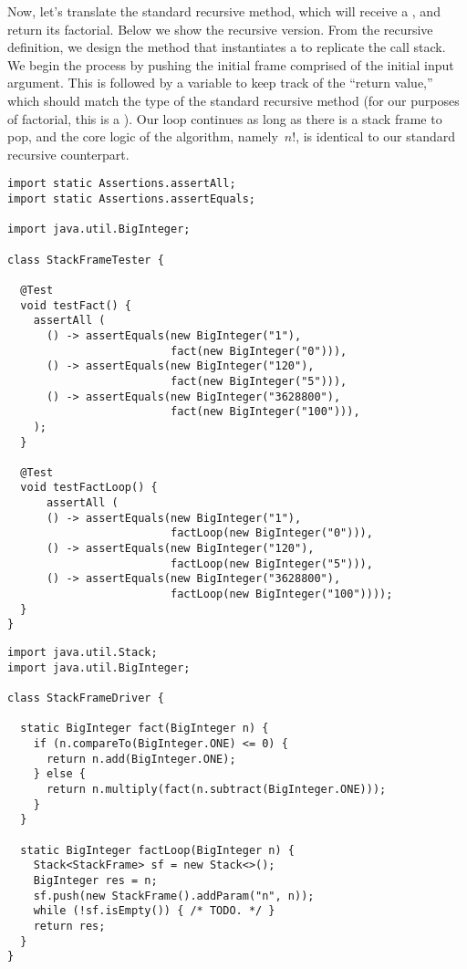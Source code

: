 Now, let's translate the standard recursive  method, which will receive a , and return its factorial. 
Below we show the recursive version. 
From the recursive definition, we design the  method that instantiates a  to replicate the call stack. 
We begin the process by pushing the initial frame comprised of the initial input argument. 
This is followed by a variable to keep track of the ``return value,'' which should match the type of the standard recursive method (for our purposes of factorial, this is a ). 
Our loop continues as long as there is a stack frame to pop, and the core logic of the algorithm, namely~$n!$, is identical to our standard recursive counterpart.

\begin{lstlisting}[language=MyJava]
import static Assertions.assertAll;
import static Assertions.assertEquals;

import java.util.BigInteger;

class StackFrameTester {

  @Test
  void testFact() {
    assertAll (
      () -> assertEquals(new BigInteger("1"), 
                         fact(new BigInteger("0"))),
      () -> assertEquals(new BigInteger("120"), 
                         fact(new BigInteger("5"))),
      () -> assertEquals(new BigInteger("3628800"), 
                         fact(new BigInteger("100"))),
    );
  }

  @Test
  void testFactLoop() {
      assertAll (
      () -> assertEquals(new BigInteger("1"), 
                         factLoop(new BigInteger("0"))),
      () -> assertEquals(new BigInteger("120"), 
                         factLoop(new BigInteger("5"))),
      () -> assertEquals(new BigInteger("3628800"), 
                         factLoop(new BigInteger("100"))));
  }
}  
\end{lstlisting}

\begin{lstlisting}[language=MyJava]
import java.util.Stack;
import java.util.BigInteger;

class StackFrameDriver {

  static BigInteger fact(BigInteger n) {
    if (n.compareTo(BigInteger.ONE) <= 0) {
      return n.add(BigInteger.ONE);
    } else {
      return n.multiply(fact(n.subtract(BigInteger.ONE)));
    }
  }

  static BigInteger factLoop(BigInteger n) {
    Stack<StackFrame> sf = new Stack<>();
    BigInteger res = n;
    sf.push(new StackFrame().addParam("n", n));
    while (!sf.isEmpty()) { /* TODO. */ }
    return res;
  }
}
\end{lstlisting}

